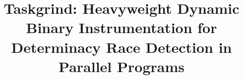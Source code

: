 \title{Taskgrind: Heavyweight Dynamic Binary Instrumentation for Determinacy Race Detection in Parallel Programs}
